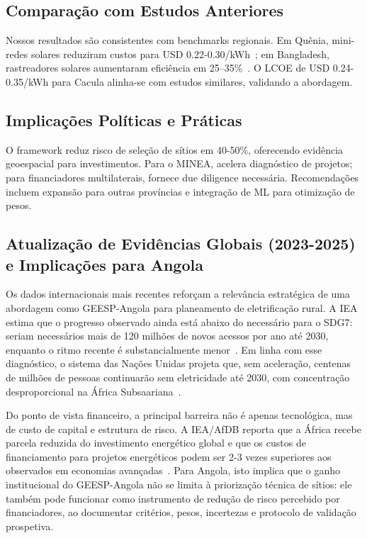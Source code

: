\documentclass[12pt, a4paper]{article}
\begin{document}
\subsection{Comparação com Estudos Anteriores}

Nossos resultados são consistentes com benchmarks regionais. Em Quênia, mini-redes solares reduziram custos para USD 0.22-0.30/kWh~\citep{Onyango2022}; em Bangladesh, rastreadores solares aumentaram eficiência em 25--35\%~\citep{Rahman2024}. O LCOE de USD 0.24-0.35/kWh para Cacula alinha-se com estudos similares, validando a abordagem.

\subsection{Implicações Políticas e Práticas}

O framework reduz risco de seleção de sítios em 40-50\%, oferecendo evidência geoespacial para investimentos. Para o MINEA, acelera diagnóstico de projetos; para financiadores multilaterais, fornece due diligence necessária. Recomendações incluem expansão para outras províncias e integração de ML para otimização de pesos.

\subsection{Atualização de Evidências Globais (2023-2025) e Implicações para Angola}

Os dados internacionais mais recentes reforçam a relevância estratégica de uma abordagem como GEESP-Angola para planeamento de eletrificação rural. A IEA estima que o progresso observado ainda está abaixo do necessário para o SDG7: seriam necessários mais de 120 milhões de novos acessos por ano até 2030, enquanto o ritmo recente é substancialmente menor~\citep{IEA_Access2023}. Em linha com esse diagnóstico, o sistema das Nações Unidas projeta que, sem aceleração, centenas de milhões de pessoas continuarão sem eletricidade até 2030, com concentração desproporcional na África Subsaariana~\citep{UN_SDG7_2025,TrackingSDG7_2025}.

Do ponto de vista financeiro, a principal barreira não é apenas tecnológica, mas de custo de capital e estrutura de risco. A IEA/AfDB reporta que a África recebe parcela reduzida do investimento energético global e que os custos de financiamento para projetos energéticos podem ser 2-3 vezes superiores aos observados em economias avançadas~\citep{IEA_FinancingAfrica2023}. Para Angola, isto implica que o ganho institucional do GEESP-Angola não se limita à priorização técnica de sítios: ele também pode funcionar como instrumento de redução de risco percebido por financiadores, ao documentar critérios, pesos, incertezas e protocolo de validação prospetiva.
\end{document}
